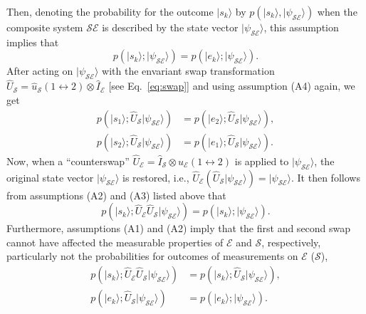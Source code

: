 \documentclass[rmp,aps,amsmath,amsfonts,noshowkeys,noshowpacs,12pt]{revtex4}
\newcommand{\ket}[1]{\ensuremath{|{#1\rangle}}}
\begin{document}
Then, denoting the probability for the outcome $\ket{s_k}$ by
$p(\ket{s_k}, \ket{\psi_\mathcal{SE}})$ when the composite system
$\mathcal{SE}$ is described by the state vector
$\ket{\psi_\mathcal{SE}}$, this assumption implies that
%
\begin{equation} \label{eq:1} 
p(\ket{s_k}; \ket{\psi_\mathcal{SE}}) = p(\ket{e_k};
\ket{\psi_\mathcal{SE}}).
\end{equation}
%
After acting on $\ket{\psi_\mathcal{SE}}$ with the envariant swap
transformation $\widehat{U}_\mathcal{S} = \widehat{u}_\mathcal{S}(1
\leftrightarrow 2) \otimes \widehat{I}_\mathcal{E}$ [see
Eq.~\eqref{eq:swap}] and using assumption (A4) again, we get
%
\begin{equation} \label{eq:2} 
\begin{split}
p(\ket{s_1}; \widehat{U}_\mathcal{S}\ket{\psi_\mathcal{SE}}) &= p(\ket{e_2};
\widehat{U}_\mathcal{S}\ket{\psi_\mathcal{SE}}), \\ p(\ket{s_2};
\widehat{U}_\mathcal{S}\ket{\psi_\mathcal{SE}}) &= p(\ket{e_1};
\widehat{U}_\mathcal{S}\ket{\psi_\mathcal{SE}}). 
\end{split}
\end{equation}
%
Now, when a ``counterswap'' $\widehat{U}_\mathcal{E} =
\widehat{I}_\mathcal{S} \otimes u_\mathcal{E}(1 \leftrightarrow 2)$ is
applied to $\ket{\psi_\mathcal{SE}}$, the original state vector
$\ket{\psi_\mathcal{SE}}$ is restored, i.e., $\widehat{U}_\mathcal{E}
(\widehat{U}_\mathcal{S} \ket{\psi_\mathcal{SE}}) =
\ket{\psi_\mathcal{SE}}$. It then follows from assumptions (A2) and
(A3) listed above that
%
\begin{equation} \label{eq:3} 
  p(\ket{s_k}; \widehat{U}_\mathcal{E} \widehat{U}_\mathcal{S}
  \ket{\psi_\mathcal{SE}}) = p(\ket{s_k}; \ket{\psi_\mathcal{SE}}).
\end{equation}
%
Furthermore, assumptions (A1) and (A2) imply that the first and second
swap cannot have affected the measurable properties of $\mathcal{E}$
and $\mathcal{S}$, respectively, particularly not the probabilities
for outcomes of measurements on $\mathcal{E}$ ($\mathcal{S}$),
%
\begin{equation} \label{eq:4}
\begin{split}
  p(\ket{s_k}; \widehat{U}_\mathcal{E} \widehat{U}_\mathcal{S}
  \ket{\psi_\mathcal{SE}}) &= p(\ket{s_k}; \widehat{U}_\mathcal{S}
  \ket{\psi_\mathcal{SE}}),\\
  p(\ket{e_k}; \widehat{U}_\mathcal{S} \ket{\psi_\mathcal{SE}}) &=
  p(\ket{e_k}; \ket{\psi_\mathcal{SE}}).
\end{split}
\end{equation}
\end{document}
